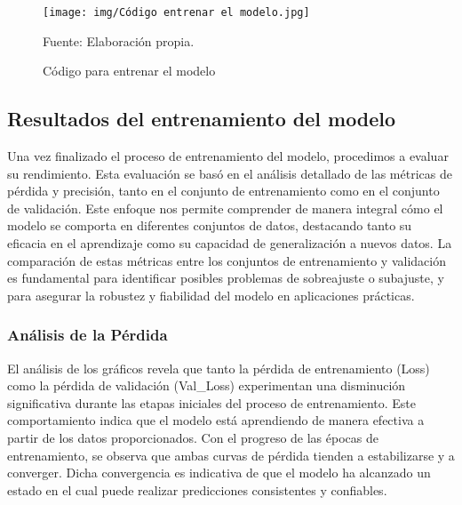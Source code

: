 \begin{figure}[H]
    \begin{minipage}[t]{0.9\textwidth}
        \caption{Código para entrenar el modelo}
        \label{entrenar_modelo}        
    \end{minipage}

    \vspace{10pt}

    \begin{minipage}[b]{1\textwidth}
        \centering
        \texttt{[image: img/Código entrenar el modelo.jpg]}        
    \end{minipage}

    \begin{minipage}[t]{0.9\textwidth}
        Fuente: Elaboración propia.
    \end{minipage}
\end{figure}


\subsection{Resultados del entrenamiento del modelo}

Una vez finalizado el proceso de entrenamiento del modelo, procedimos a evaluar su rendimiento. Esta evaluación se basó en el análisis detallado de las métricas de pérdida y precisión, tanto en el conjunto de entrenamiento como en el conjunto de validación. Este enfoque nos permite comprender de manera integral cómo el modelo se comporta en diferentes conjuntos de datos, destacando tanto su eficacia en el aprendizaje como su capacidad de generalización a nuevos datos. La comparación de estas métricas entre los conjuntos de entrenamiento y validación es fundamental para identificar posibles problemas de sobreajuste o subajuste, y para asegurar la robustez y fiabilidad del modelo en aplicaciones prácticas.
\subsubsection{\textbf{Análisis de la Pérdida}} 
El análisis de los gráficos revela que tanto la pérdida de entrenamiento (Loss) como la pérdida de validación (Val\_Loss) experimentan una disminución significativa durante las etapas iniciales del proceso de entrenamiento. Este comportamiento indica que el modelo está aprendiendo de manera efectiva a partir de los datos proporcionados. Con el progreso de las épocas de entrenamiento, se observa que ambas curvas de pérdida tienden a estabilizarse y a converger. Dicha convergencia es indicativa de que el modelo ha alcanzado un estado en el cual puede realizar predicciones consistentes y confiables.

